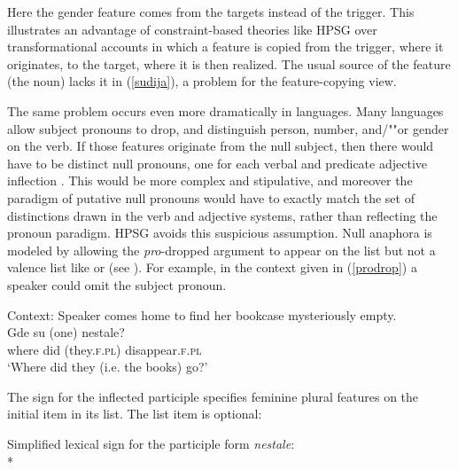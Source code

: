 \documentclass[output=paper
	        ,collection
	        ,collectionchapter
 	        ,biblatex
                ,babelshorthands
                ,newtxmath
                ,draftmode
                ,colorlinks, citecolor=brown
]{langscibook}
\begin{document}
\noindent 
Here the gender feature comes from the targets instead of the trigger.   This illustrates an advantage of constraint-based theories like HPSG over transformational accounts in which a feature is copied from the trigger, where it originates, to the target, where it is then realized.  The usual source of the feature (the noun) lacks it in (\ref{sudija}), a problem for the feature-copying view.   

The same problem occurs even more dramatically in  languages.  Many languages
allow subject pronouns to drop, and distinguish person, number, and/""or gender on the verb.  If those
features originate from the null subject, then there would have to be distinct null pronouns, one
for each verbal and predicate adjective inflection \citep[64]{Pollard+Sag:1994}.  This would be more
complex and stipulative, and moreover the paradigm of putative null pronouns would have to exactly
match the set of distinctions drawn in the verb and adjective systems, rather than reflecting the
pronoun paradigm.    HPSG avoids this suspicious assumption.  Null anaphora is modeled by allowing
the \textit{pro}-dropped argument to appear on the \argst list but not a valence list like \subj or \comps (see ).  For example, in the context given in (\ref{prodrop}) a  speaker could omit the subject pronoun.  

\begin{exe}
\ex 
\label{prodrop}
Context: Speaker comes home to find her bookcase mysteriously empty. \\
\gll  Gde su (one) nestale? \\
where did (they.\textsc{f.pl}) disappear.\textsc{f.pl}     \\
\glt `Where did they (i.e. the books) go?' 
\end{exe}


\noindent
The sign for the inflected participle specifies feminine plural features on the initial item in its \argst list.  The \subj list item is optional: 

\begin{exe} 
\ex		\label{nestale} 
Simplified lexical sign for the participle form \textit{nestale}:\\*
\end{exe}
\end{document}
